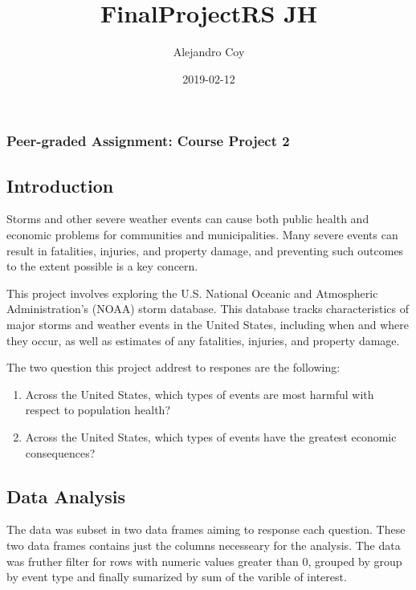 \documentclass[]{article}
\title{FinalProjectRS JH}
\author{Alejandro Coy}
\date{2019-02-12}
\begin{document}
\maketitle

\subsubsection{Peer-graded Assignment: Course Project
2}\label{peer-graded-assignment-course-project-2}

\subsection{Introduction}\label{introduction}

Storms and other severe weather events can cause both public health and
economic problems for communities and municipalities. Many severe events
can result in fatalities, injuries, and property damage, and preventing
such outcomes to the extent possible is a key concern.

This project involves exploring the U.S. National Oceanic and
Atmospheric Administration's (NOAA) storm database. This database tracks
characteristics of major storms and weather events in the United States,
including when and where they occur, as well as estimates of any
fatalities, injuries, and property damage.

The two question this project addrest to respones are the following:

\begin{enumerate}
\def\labelenumi{\arabic{enumi}.}
\item
  Across the United States, which types of events are most harmful with
  respect to population health?
\item
  Across the United States, which types of events have the greatest
  economic consequences?
\end{enumerate}

\subsection{Data Analysis}\label{data-analysis}

The data was subset in two data frames aiming to response each question.
These two data frames contains just the columns necesseary for the
analysis. The data was fruther filter for rows with numeric values
greater than 0, grouped by group by event type and finally sumarized by
sum of the varible of interest.
\end{document}
